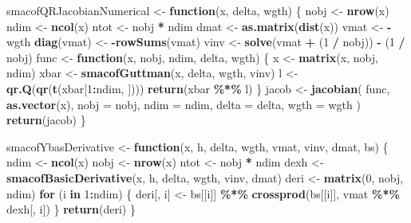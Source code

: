 \documentclass[
  12pt,
]{article}
\newenvironment{Shaded}{\begin{snugshade}}{\end{snugshade}}
\newcommand{\AttributeTok}[1]{\textcolor[rgb]{0.13,0.29,0.53}{#1}}
\newcommand{\ControlFlowTok}[1]{\textcolor[rgb]{0.13,0.29,0.53}{\textbf{#1}}}
\newcommand{\DecValTok}[1]{\textcolor[rgb]{0.00,0.00,0.81}{#1}}
\newcommand{\FunctionTok}[1]{\textcolor[rgb]{0.13,0.29,0.53}{\textbf{#1}}}
\newcommand{\NormalTok}[1]{#1}
\newcommand{\OtherTok}[1]{\textcolor[rgb]{0.56,0.35,0.01}{#1}}
\newcommand{\SpecialCharTok}[1]{\textcolor[rgb]{0.81,0.36,0.00}{\textbf{#1}}}
\begin{document}
\begin{Shaded}
\begin{Highlighting}[]
\NormalTok{smacofQRJacobianNumerical }\OtherTok{\textless{}{-}} \ControlFlowTok{function}\NormalTok{(x, delta, wgth) \{}
\NormalTok{  nobj }\OtherTok{\textless{}{-}} \FunctionTok{nrow}\NormalTok{(x)}
\NormalTok{  ndim }\OtherTok{\textless{}{-}} \FunctionTok{ncol}\NormalTok{(x)}
\NormalTok{  ntot }\OtherTok{\textless{}{-}}\NormalTok{ nobj }\SpecialCharTok{*}\NormalTok{ ndim}
\NormalTok{  dmat }\OtherTok{\textless{}{-}} \FunctionTok{as.matrix}\NormalTok{(}\FunctionTok{dist}\NormalTok{(x))}
\NormalTok{  vmat }\OtherTok{\textless{}{-}} \SpecialCharTok{{-}}\NormalTok{wgth}
  \FunctionTok{diag}\NormalTok{(vmat) }\OtherTok{\textless{}{-}} \SpecialCharTok{{-}}\FunctionTok{rowSums}\NormalTok{(vmat)}
\NormalTok{  vinv }\OtherTok{\textless{}{-}} \FunctionTok{solve}\NormalTok{(vmat }\SpecialCharTok{+}\NormalTok{ (}\DecValTok{1} \SpecialCharTok{/}\NormalTok{ nobj)) }\SpecialCharTok{{-}}\NormalTok{ (}\DecValTok{1} \SpecialCharTok{/}\NormalTok{ nobj)}
\NormalTok{  func }\OtherTok{\textless{}{-}} \ControlFlowTok{function}\NormalTok{(x, nobj, ndim, delta, wgth) \{}
\NormalTok{    x }\OtherTok{\textless{}{-}} \FunctionTok{matrix}\NormalTok{(x, nobj, ndim)}
\NormalTok{    xbar }\OtherTok{\textless{}{-}} \FunctionTok{smacofGuttman}\NormalTok{(x, delta, wgth, vinv)}
\NormalTok{    l }\OtherTok{\textless{}{-}} \FunctionTok{qr.Q}\NormalTok{(}\FunctionTok{qr}\NormalTok{(}\FunctionTok{t}\NormalTok{(xbar[}\DecValTok{1}\SpecialCharTok{:}\NormalTok{ndim, ])))}
    \FunctionTok{return}\NormalTok{(xbar }\SpecialCharTok{\%*\%}\NormalTok{ l)}
\NormalTok{  \}}
\NormalTok{  jacob }\OtherTok{\textless{}{-}} \FunctionTok{jacobian}\NormalTok{(}
\NormalTok{    func,}
    \FunctionTok{as.vector}\NormalTok{(x),}
    \AttributeTok{nobj =}\NormalTok{ nobj,}
    \AttributeTok{ndim =}\NormalTok{ ndim,}
    \AttributeTok{delta =}\NormalTok{ delta,}
    \AttributeTok{wgth =}\NormalTok{ wgth}
\NormalTok{  )}
  \FunctionTok{return}\NormalTok{(jacob)}
\NormalTok{\}}

\NormalTok{smacofYbasDerivative }\OtherTok{\textless{}{-}} \ControlFlowTok{function}\NormalTok{(x, h, delta, wgth, vmat, vinv, dmat, bs) \{}
\NormalTok{  ndim }\OtherTok{\textless{}{-}} \FunctionTok{ncol}\NormalTok{(x)}
\NormalTok{  nobj }\OtherTok{\textless{}{-}} \FunctionTok{nrow}\NormalTok{(x)}
\NormalTok{  ntot }\OtherTok{\textless{}{-}}\NormalTok{ nobj }\SpecialCharTok{*}\NormalTok{ ndim}
\NormalTok{  dexh }\OtherTok{\textless{}{-}} \FunctionTok{smacofBasicDerivative}\NormalTok{(x, h, delta, wgth, vinv, dmat)}
\NormalTok{  deri }\OtherTok{\textless{}{-}} \FunctionTok{matrix}\NormalTok{(}\DecValTok{0}\NormalTok{, nobj, ndim)}
  \ControlFlowTok{for}\NormalTok{ (i }\ControlFlowTok{in} \DecValTok{1}\SpecialCharTok{:}\NormalTok{ndim) \{}
\NormalTok{    deri[, i] }\OtherTok{\textless{}{-}}\NormalTok{ bs[[i]] }\SpecialCharTok{\%*\%} \FunctionTok{crossprod}\NormalTok{(bs[[i]], vmat }\SpecialCharTok{\%*\%}\NormalTok{ dexh[, i])}
\NormalTok{  \}}
  \FunctionTok{return}\NormalTok{(deri)}
\NormalTok{\}}


\end{Highlighting}
\end{Shaded}
\end{document}

